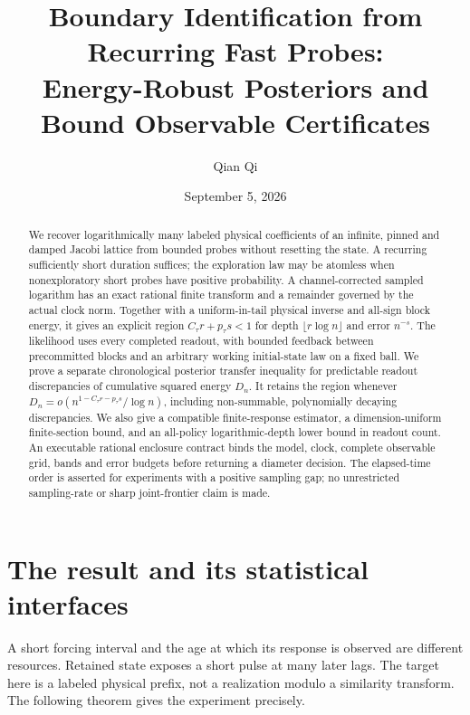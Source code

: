 \documentclass[11pt,reqno]{amsart}
\title[Energy-robust boundary identification]{Boundary Identification from Recurring Fast Probes:\\Energy-Robust Posteriors and Bound Observable Certificates}
\author{Qian Qi}
\date{September 5, 2026}
\theoremstyle{remark}\newtheorem{remark}[theorem]{Remark}
\begin{document}
\begin{abstract}
We recover logarithmically many labeled physical coefficients of an infinite,
pinned and damped Jacobi lattice from bounded probes without resetting the
state. A recurring sufficiently short duration suffices; the exploration law
may be atomless when nonexploratory short probes have positive probability.
A channel-corrected sampled logarithm has an exact rational finite transform
and a remainder governed by the actual clock norm. Together with a
uniform-in-tail physical inverse and all-sign block energy, it gives an
explicit region $C_\tau r+p_\tau s<1$ for depth $\lfloor r\log n\rfloor$
and error $n^{-s}$. The likelihood uses every completed readout, with bounded
feedback between precommitted blocks and an arbitrary working initial-state
law on a fixed ball. We prove a separate chronological posterior transfer
inequality for predictable readout discrepancies of cumulative squared energy
$D_n$. It retains the region whenever $D_n=o(n^{1-C_\tau r-p_\tau s}/\log n)$,
including non-summable, polynomially decaying discrepancies. We also give a
compatible finite-response estimator, a dimension-uniform finite-section
bound, and an all-policy logarithmic-depth lower bound in readout count.
An executable rational enclosure contract binds the model, clock, complete
observable grid, bands and error budgets before returning a diameter decision.
The elapsed-time order is asserted for experiments with a positive sampling
gap; no unrestricted sampling-rate or sharp joint-frontier claim is made.
\end{abstract}
\maketitle
\tableofcontents

\section{The result and its statistical interfaces}
A short forcing interval and the age at which its response is observed are
different resources. Retained state exposes a short pulse at many later lags.
The target here is a labeled physical prefix, not a realization modulo a
similarity transform. The following theorem gives the experiment precisely.
\end{document}
